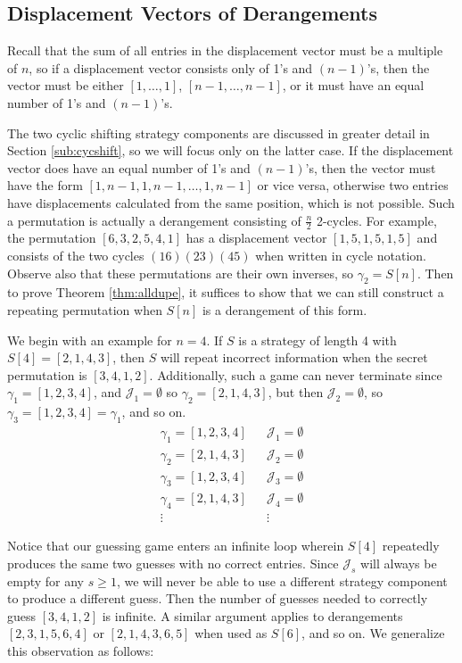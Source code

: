 \documentclass[article]{amsart}
\theoremstyle{plain}
\begin{document}
\subsection{Displacement Vectors of Derangements} \label{sub:1&n-1}

Recall that the sum of all entries in the displacement vector must be a multiple of $n$, so if a displacement vector consists only of 1's and $(n-1)$'s, then the vector must be either $[1,\dots, 1]$, $[n-1, \dots, n-1]$, or it must have an equal number of 1's and $(n-1)$'s. 

The two cyclic shifting strategy components are discussed in greater detail in Section \ref{sub:cycshift}, so we will focus only on the latter case. If the displacement vector does have an equal number of 1's and $(n-1)$'s, then the vector must have the form $[1,n-1,1,n-1,\dots, 1,n-1]$ or vice versa, otherwise two entries have displacements calculated from the same position, which is not possible. Such a permutation is actually a derangement consisting of $\frac{n}{2}$ 2-cycles. For example, the permutation $[6,3,2,5,4,1]$ has a displacement vector $[1,5,1,5,1,5]$ and consists of the two cycles $(16)(23)(45)$ when written in cycle notation. Observe also that these permutations are their own inverses, so $\gamma_2 = S[n]$. Then to prove Theorem \ref{thm:alldupe}, it suffices to show that we can still construct a repeating permutation when $S[n]$ is a derangement of this form.
 
We begin with an example for $n=4$. If $S$ is a strategy of length 4 with $S[4] = [2,1,4,3]$, then $S$ will repeat incorrect information when the secret permutation is $[3,4,1,2]$. Additionally, such a game can never terminate since $\gamma_1 = [1,2,3,4]$, and $\mathcal{J}_1 = \emptyset$ so $\gamma_2 = [2,1,4,3]$, but then $\mathcal{J}_2 = \emptyset$, so $\gamma_3 = [1,2,3,4] = \gamma_1$, and so on. 
\[ 
\begin{array}{ccc}
    \gamma_1 = [1,2,3,4] & & \mathcal{J}_1 = \emptyset \\
    \gamma_2 = [2,1,4,3] & & \mathcal{J}_2 = \emptyset \\
    \gamma_3 = [1,2,3,4] & & \mathcal{J}_3 = \emptyset \\
    \gamma_4 = [2,1,4,3] & & \mathcal{J}_4 = \emptyset \\
    \vdots & & \vdots
\end{array} 
\]

Notice that our guessing game enters an infinite loop wherein $S[4]$ repeatedly produces the same two guesses with no correct entries. Since $\mathcal{J}_s$ will always be empty for any $s \geq 1$, we will never be able to use a different strategy component to produce a different guess. Then the number of guesses needed to correctly guess $[3,4,1,2]$ is infinite. %
A similar argument applies to derangements $[2,3,1,5,6,4]$ or $[2,1,4,3,6,5]$ when used as $S[6]$, and so on. We generalize this observation as follows:
\end{document}

